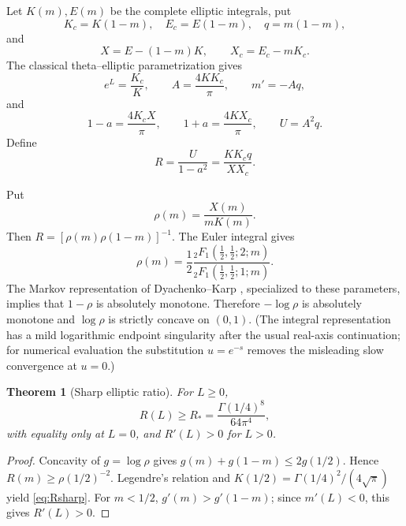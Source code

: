\documentclass[10pt,a4paper]{amsart}
\numberwithin{equation}{section}
\newtheorem{theorem}{Theorem}[section]
\newcommand{\Rstar}{R_*}
\begin{document}
Let $K(m),E(m)$ be the complete elliptic integrals, put
\[
 K_c=K(1-m),\quad E_c=E(1-m),\quad q=m(1-m),
\]
and
\[
 X=E-(1-m)K,\qquad X_c=E_c-mK_c.
\]
The classical theta--elliptic parametrization gives
\begin{equation}\label{eq:ellipticbasic}
 e^L=\frac{K_c}{K},\qquad
 A=\frac{4KK_c}{\pi},\qquad
 m'=-Aq,
\end{equation}
and
\begin{equation}\label{eq:phaseell}
 1-a=\frac{4K_cX}{\pi},\qquad
 1+a=\frac{4KX_c}{\pi},\qquad
 U=A^2q.
\end{equation}
Define
\begin{equation}\label{eq:Rdef}
 R=\frac{U}{1-a^2}
 =\frac{KK_cq}{XX_c}.
\end{equation}

Put
\begin{equation}\label{eq:rhoell}
 \rho(m)=\frac{X(m)}{mK(m)}.
\end{equation}
Then $R=[\rho(m)\rho(1-m)]^{-1}$.  The Euler integral gives
\begin{equation}\label{eq:rhohyp}
 \rho(m)=\frac12
 \frac{{}_2F_1(\frac12,\frac12;2;m)}{{}_2F_1(\frac12,\frac12;1;m)}.
\end{equation}
The Markov representation of Dyachenko--Karp \cite[Example~8]{DyachenkoKarp2022}, specialized to these parameters, implies that $1-\rho$ is absolutely monotone.  Therefore $-\log\rho$ is absolutely monotone and $\log\rho$ is strictly concave on $(0,1)$.  (The integral representation has a mild logarithmic endpoint singularity after the usual real-axis continuation; for numerical evaluation the substitution $u=e^{-s}$ removes the misleading slow convergence at $u=0$.)


\begin{theorem}[Sharp elliptic ratio]\label{thm:Rsharp}
For $L\ge0$,
\begin{equation}\label{eq:Rsharp}
 \boxed{\qquad R(L)\ge\Rstar=\frac{\Gamma(1/4)^8}{64\pi^4},\qquad}
\end{equation}
with equality only at $L=0$, and $R'(L)>0$ for $L>0$.
\end{theorem}

\begin{proof}
Concavity of $g=\log\rho$ gives
$g(m)+g(1-m)\le2g(1/2)$.  Hence $R(m)\ge\rho(1/2)^{-2}$.  Legendre's relation and $K(1/2)=\Gamma(1/4)^2/(4\sqrt\pi)$ yield \eqref{eq:Rsharp}.  For $m<1/2$, $g'(m)>g'(1-m)$; since $m'(L)<0$, this gives $R'(L)>0$.
\end{proof}
\end{document}
